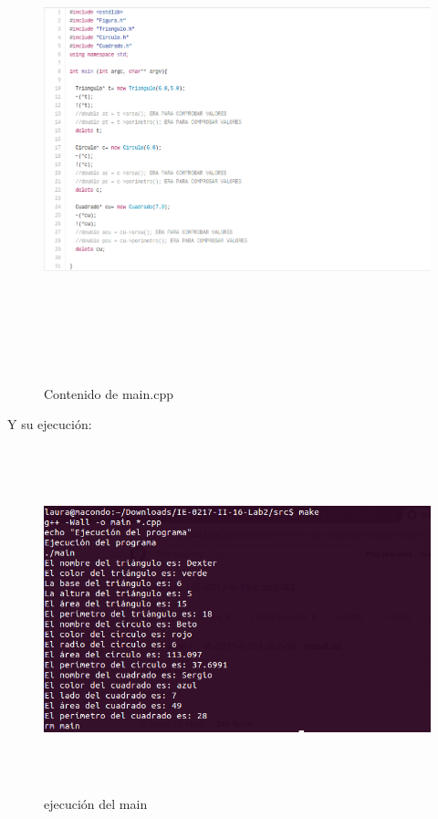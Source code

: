 \documentclass[11pt]{article}
\begin{document}
\begin{figure}[H]
\centering
\includegraphics[height=14cm, width=\textwidth]{img/main.png}
\caption{Contenido de main.cpp}
\label{fig:main}
\end{figure}

\newpage
Y su ejecución: 

\begin{figure}[H]
\centering
\includegraphics[height=10cm, width=\textwidth]{img/ejecucion.png}
\caption{ejecución del main}
\label{fig:ejecucion}
\end{figure}
\end{document}
